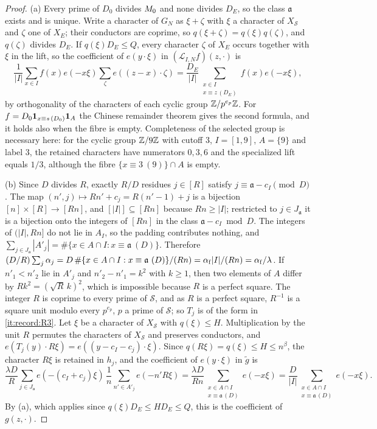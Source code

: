 \begin{proof}
(a) Every prime of $D_0$ divides $M_0$ and none divides $D_E$, so the
class $\mathfrak a$ exists and is unique. Write a character of $G_N$ as $\xi+\zeta$
with $\xi$ a character of $X_{\mathcal S}$ and $\zeta$ one of $X_E$; their
conductors are coprime, so $q(\xi+\zeta)=q(\xi)q(\zeta)$, and $q(\zeta)$
divides $D_E$. If $q(\xi)D_E\le Q$, every character $\zeta$ of $X_E$ occurs
together with $\xi$ in the lift, so the coefficient of $e(y\cdot\xi)$ in
$(\mathcal L_{I,N}f)(z,\cdot)$ is
\[
 \frac1{|I|}\sum_{x\in I}f(x)e(-x\xi)\sum_{\zeta}e((z-x)\cdot\zeta)
 =\frac{D_E}{|I|}\sum_{\substack{x\in I\\ x\equiv z\,(D_E)}}f(x)e(-x\xi),
\]
by orthogonality of the characters of each cyclic group $\mathbb Z/p^{e_p}\mathbb Z$. For
$f=D_0\mathbf 1_{x\equiv s\,(D_0)}\mathbf 1_A$ the Chinese remainder theorem
gives the second formula, and it holds also when the fibre is empty.
Completeness of the selected group is necessary here: for the cyclic group
$\mathbb Z/9\mathbb Z$ with cutoff $3$, $I=[1,9]$, $A=\{9\}$ and label $3$, the retained
characters have numerators $0,3,6$ and the specialized lift equals $1/3$,
although the fibre $\{x\equiv3\ (9)\}\cap A$ is empty.

(b) Since $D$ divides $R$, exactly $R/D$ residues $j\in[R]$ satisfy
$j\equiv\mathfrak a-c_I\pmod D$. The map $(n',j)\mapsto Rn'+c_j=R(n'-1)+j$ is a
bijection $[n]\times[R]\to[Rn]$, and $[|I|]\subseteq[Rn]$ because
$Rn\ge|I|$; restricted to $j\in J_{\mathfrak a}$ it is a bijection onto the integers of
$[Rn]$ in the class $\mathfrak a-c_I\bmod D$. The integers of $(|I|,Rn]$ do not lie in
$A_I$, so the padding contributes nothing, and
$\sum_{j\in J_{\mathfrak a}}|A'_j|=\#\{x\in A\cap I:x\equiv\mathfrak a\ (D)\}$. Therefore
$(D/R)\sum_j\alpha_j=D\,\#\{x\in A\cap I:x\equiv\mathfrak a\ (D)\}/(Rn)
=\alpha_{\rm f}|I|/(Rn)=\alpha_{\rm f}/\lambda$. If $n'_1<n'_2$ lie in
$A'_j$ and $n'_2-n'_1=k^2$ with $k\ge1$, then two elements of $A$ differ by
$Rk^2=(\sqrt R\,k)^2$, which is impossible because $R$ is a perfect square.
The integer $R$ is coprime to every prime of $\mathcal S$, and as $R$ is a
perfect square, $R^{-1}$ is a square unit modulo every $p^{e_p}$, $p$ a prime
of $\mathcal S$; so $T_j$ is of the form in \ref{it:record:R3}. Let $\xi$ be
a character of $X_{\mathcal S}$ with $q(\xi)\le H$. Multiplication by the
unit $R$ permutes the characters of $X_{\mathcal S}$ and preserves
conductors, and $e(T_j(y)\cdot R\xi)=e((y-c_I-c_j)\cdot\xi)$. Since
$q(R\xi)=q(\xi)\le H\le n^\beta$, the character $R\xi$ is retained in $h_j$,
and the coefficient of $e(y\cdot\xi)$ in $\widetilde g$ is
\[
 \frac{\lambda D}{R}\sum_{j\in J_{\mathfrak a}}e(-(c_I+c_j)\xi)\,
 \frac1n\sum_{n'\in A'_j}e(-n'R\xi)
 =\frac{\lambda D}{Rn}\sum_{\substack{x\in A\cap I\\ x\equiv\mathfrak a\,(D)}}e(-x\xi)
 =\frac D{|I|}\sum_{\substack{x\in A\cap I\\ x\equiv\mathfrak a\,(D)}}e(-x\xi).
\]
By (a), which applies since $q(\xi)D_E\le HD_E\le Q$, this is the
coefficient of $g(z,\cdot)$.


\end{proof}
